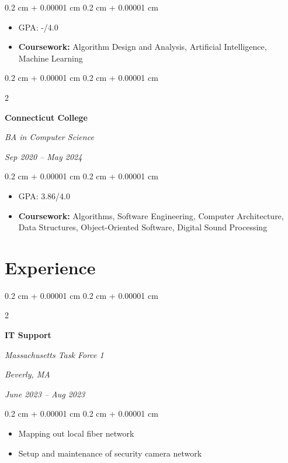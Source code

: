 \documentclass[10pt, letterpaper]{article}
\newenvironment{highlights}{
    \begin{itemize}[
        topsep=0.10 cm,
        parsep=0.10 cm,
        partopsep=0pt,
        itemsep=0pt,
        leftmargin=0.4 cm + 10pt
    ]
}{
    \end{itemize}
} %
\newenvironment{onecolentry}{
    \begin{adjustwidth}{
        0.2 cm + 0.00001 cm
    }{
        0.2 cm + 0.00001 cm
    }
}{
    \end{adjustwidth}
} %
\newenvironment{twocolentry}[2][]{
    \onecolentry
    \def\secondColumn{#2}
    \setcolumnwidth{\fill, 4.5 cm}
    \begin{paracol}{2}
}{
    \switchcolumn \raggedleft \secondColumn
    \end{paracol}
    \endonecolentry
} %
\begin{document}
        \vspace{0.10 cm}
        \begin{onecolentry}
            \begin{highlights}
                \item GPA: -/4.0
                \item \textbf{Coursework:} Algorithm Design and Analysis, Artificial Intelligence, Machine Learning
            \end{highlights}
        \end{onecolentry}



        \begin{twocolentry}{
            
            
        \textit{Sep 2020 – May 2024}}
            \textbf{Connecticut College}

            \textit{BA in Computer Science}
        \end{twocolentry}

        \vspace{0.10 cm}
        \begin{onecolentry}
            \begin{highlights}
                \item GPA: 3.86/4.0
                \item \textbf{Coursework:} Algorithms, Software Engineering, Computer Architecture, Data Structures, Object-Oriented Software, Digital Sound Processing
            \end{highlights}
        \end{onecolentry}



    
    \section{Experience}



        
        \begin{twocolentry}{
        \textit{Beverly, MA}    
            
        \textit{June 2023 – Aug 2023}}
            \textbf{IT Support}
            
            \textit{Massachusetts Task Force 1}
        \end{twocolentry}

        \vspace{0.10 cm}
        \begin{onecolentry}
            \begin{highlights}
                \item Mapping out local fiber network
                \item Setup and maintenance of security camera network
            \end{highlights}
        \end{onecolentry}
\end{document}
